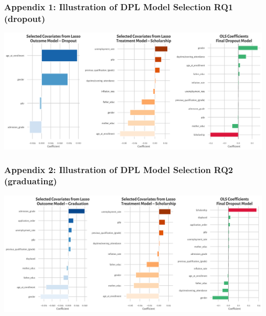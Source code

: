 \documentclass[aspectratio=169]{beamer}
\begin{document}
\begin{frame}
  \frametitle{Appendix 1: Illustration of DPL Model Selection RQ1 (dropout)}
  \hypertarget{appendix-slide}{}
  \vspace{10pt}
  \centering
  \includegraphics[width=1\linewidth]{Tex_Pictures/DPL_RQ1_model_selection}
  \vfill
  \raggedleft
  \hyperlink{main-slide}{}
\end{frame}  

\begin{frame}
  \frametitle{Appendix 2: Illustration of DPL Model Selection RQ2 (graduating)}
  \hypertarget{appendix-slide2}{}
  \vspace{10pt}
  \centering
  \includegraphics[width=1\linewidth]{Tex_Pictures/DPL_RQ2_model_selection}
  \vfill
  \raggedleft
  \hyperlink{main-slide2}{}
\end{frame}
\end{document}
